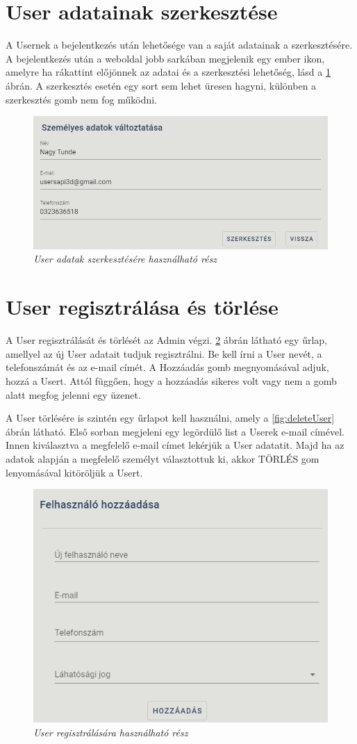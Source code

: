 \section{User adatainak szerkesztése}
A Usernek a bejelentkezés után lehetősége van a saját adatainak a szerkesztésére. A bejelentkezés után a weboldal jobb sarkában megjelenik egy ember ikon, amelyre ha rákattint előjönnek az adatai és a szerkesztési lehetőség, lásd a \ref{fig:userUpdate} ábrán. A szerkesztés esetén egy sort sem lehet üresen hagyni, különben a szerkesztés gomb nem fog működni. 
\begin{figure}[H]
	\centering
	\includegraphics[width=0.7\linewidth]{figures/images/userUpdate.png}
	\caption[User adatak szerkesztésére használható rész]{\textit{User adatak szerkesztésére használható rész}}
	\label{fig:userUpdate}
\end{figure}

\section{User regisztrálása és törlése}
A User regisztrálását és törlését az Admin végzi. \ref{fig:addUser} ábrán látható egy űrlap, amellyel az új User adatait tudjuk regisztrálni. Be kell írni a User nevét, a telefonszámát és az e-mail címét. A Hozzáadás gomb megnyomásával adjuk, hozzá a Usert. Attól függően, hogy a hozzáadás sikeres volt vagy nem a gomb alatt megfog jelenni egy üzenet. 

A User törlésére is szintén egy űrlapot kell használni, amely a \ref{fig:deleteUser} ábrán látható. Első sorban megjeleni egy legördülő list a Userek e-mail címével. Innen kiválasztva a megfelelő e-mail címet lekérjük a User adatatit. Majd ha az adatok alapján a megfelelő személyt választottuk ki, akkor TÖRLÉS gom lenyomásával kitöröljük a Usert.
\begin{figure}[H]
	\centering
	\includegraphics[width=0.7\linewidth]{figures/images/userHozzaadas.png}
	\caption[User regisztrálására használható rész]{\textit{User regisztrálására használható rész}}
	\label{fig:addUser}
\end{figure}

